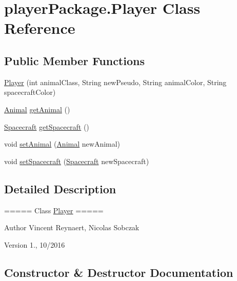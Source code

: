 \hypertarget{classplayer_package_1_1_player}{}\section{player\+Package.\+Player Class Reference}
\label{classplayer_package_1_1_player}
\subsection*{Public Member Functions}
\begin{DoxyCompactItemize}
\item 
\hyperlink{classplayer_package_1_1_player_aff98b4fbad1a0f74315e6614626b659b}{Player} (int animal\+Class, String new\+Pseudo, String animal\+Color, String spacecraft\+Color)
\item 
\hyperlink{classanimal_package_1_1_animal}{Animal} \hyperlink{classplayer_package_1_1_player_a717b010255496ff8873966397c6d2ead}{get\+Animal} ()
\item 
\hyperlink{classspace_objects_1_1_spacecraft}{Spacecraft} \hyperlink{classplayer_package_1_1_player_a02a4b5337e6deb3be1f703a3d6b33148}{get\+Spacecraft} ()
\item 
void \hyperlink{classplayer_package_1_1_player_a68501d828837b1b6babc6fb32605feb7}{set\+Animal} (\hyperlink{classanimal_package_1_1_animal}{Animal} new\+Animal)
\item 
void \hyperlink{classplayer_package_1_1_player_ab86e253738c3f4e7930d136e3837b5c4}{set\+Spacecraft} (\hyperlink{classspace_objects_1_1_spacecraft}{Spacecraft} new\+Spacecraft)
\end{DoxyCompactItemize}


\subsection{Detailed Description}
===== Class \hyperlink{classplayer_package_1_1_player}{Player} =====

\begin{DoxyAuthor}{Author}
Vincent Reynaert, Nicolas Sobczak 
\end{DoxyAuthor}
\begin{DoxyVersion}{Version}
1., 10/2016 
\end{DoxyVersion}


\subsection{Constructor \& Destructor Documentation}

